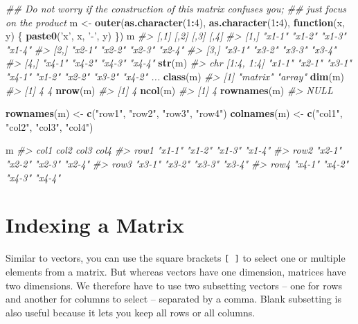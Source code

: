 \documentclass[
]{book}
\newenvironment{Shaded}{\begin{snugshade}}{\end{snugshade}}
\newcommand{\CommentTok}[1]{\textcolor[rgb]{0.56,0.35,0.01}{\textit{#1}}}
\newcommand{\ControlFlowTok}[1]{\textcolor[rgb]{0.13,0.29,0.53}{\textbf{#1}}}
\newcommand{\DecValTok}[1]{\textcolor[rgb]{0.00,0.00,0.81}{#1}}
\newcommand{\KeywordTok}[1]{\textcolor[rgb]{0.13,0.29,0.53}{\textbf{#1}}}
\newcommand{\NormalTok}[1]{#1}
\newcommand{\OperatorTok}[1]{\textcolor[rgb]{0.81,0.36,0.00}{\textbf{#1}}}
\newcommand{\StringTok}[1]{\textcolor[rgb]{0.31,0.60,0.02}{#1}}
\begin{document}
\begin{Shaded}
\begin{Highlighting}[]
\CommentTok{## Do not worry if the construction of this matrix confuses you; }
\CommentTok{## just focus on the product}
\NormalTok{m <-}\StringTok{ }\KeywordTok{outer}\NormalTok{(}\KeywordTok{as.character}\NormalTok{(}\DecValTok{1}\OperatorTok{:}\DecValTok{4}\NormalTok{), }\KeywordTok{as.character}\NormalTok{(}\DecValTok{1}\OperatorTok{:}\DecValTok{4}\NormalTok{),}
              \ControlFlowTok{function}\NormalTok{(x, y) \{}
                \KeywordTok{paste0}\NormalTok{(}\StringTok{'x'}\NormalTok{, x, }\StringTok{'-'}\NormalTok{, y)}
\NormalTok{                \})}
\NormalTok{m}
\CommentTok{#>      [,1]   [,2]   [,3]   [,4]  }
\CommentTok{#> [1,] "x1-1" "x1-2" "x1-3" "x1-4"}
\CommentTok{#> [2,] "x2-1" "x2-2" "x2-3" "x2-4"}
\CommentTok{#> [3,] "x3-1" "x3-2" "x3-3" "x3-4"}
\CommentTok{#> [4,] "x4-1" "x4-2" "x4-3" "x4-4"}
\KeywordTok{str}\NormalTok{(m)}
\CommentTok{#>  chr [1:4, 1:4] "x1-1" "x2-1" "x3-1" "x4-1" "x1-2" "x2-2" "x3-2" "x4-2" ...}
\KeywordTok{class}\NormalTok{(m)}
\CommentTok{#> [1] "matrix" "array"}
\KeywordTok{dim}\NormalTok{(m)}
\CommentTok{#> [1] 4 4}
\KeywordTok{nrow}\NormalTok{(m)}
\CommentTok{#> [1] 4}
\KeywordTok{ncol}\NormalTok{(m)}
\CommentTok{#> [1] 4}
\KeywordTok{rownames}\NormalTok{(m)}
\CommentTok{#> NULL}

\KeywordTok{rownames}\NormalTok{(m) <-}\StringTok{ }\KeywordTok{c}\NormalTok{(}\StringTok{"row1"}\NormalTok{, }\StringTok{"row2"}\NormalTok{, }\StringTok{"row3"}\NormalTok{, }\StringTok{"row4"}\NormalTok{)}
\KeywordTok{colnames}\NormalTok{(m) <-}\StringTok{ }\KeywordTok{c}\NormalTok{(}\StringTok{"col1"}\NormalTok{, }\StringTok{"col2"}\NormalTok{, }\StringTok{"col3"}\NormalTok{, }\StringTok{"col4"}\NormalTok{)}

\NormalTok{m}
\CommentTok{#>      col1   col2   col3   col4  }
\CommentTok{#> row1 "x1-1" "x1-2" "x1-3" "x1-4"}
\CommentTok{#> row2 "x2-1" "x2-2" "x2-3" "x2-4"}
\CommentTok{#> row3 "x3-1" "x3-2" "x3-3" "x3-4"}
\CommentTok{#> row4 "x4-1" "x4-2" "x4-3" "x4-4"}
\end{Highlighting}
\end{Shaded}

\hypertarget{indexing-a-matrix}{%
\section{Indexing a Matrix}\label{indexing-a-matrix}}

Similar to vectors, you can use the square brackets \texttt{{[}\ {]}} to select one or multiple elements from a matrix. But whereas vectors have one dimension, matrices have two dimensions. We therefore have to use two subsetting vectors -- one for rows and another for columns to select -- separated by a comma. Blank subsetting is also useful because it lets you keep all rows or all columns.
\end{document}
